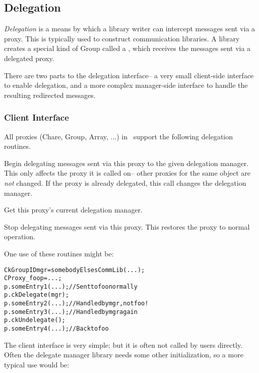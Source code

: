 \subsection{Delegation}
\label{delegation}

{\em Delegation} is a means by which a library writer can 
intercept messages sent via a proxy.  This is typically
used to construct communication libraries.
A library creates a special kind of Group called a 
, which receives the messages
sent via a delegated proxy.

There are two parts to the delegation interface-- a
very small client-side interface to enable delegation,
and a more complex manager-side interface to handle
the resulting redirected messages.

\subsubsection{Client Interface}

All proxies (Chare, Group, Array, ...) in \charmpp\ 
support the following delegation routines.

Begin delegating messages sent via this proxy to the
given delegation manager. This only affects
the proxy it is called on-- other proxies for the
same object are {\em not} changed. If the proxy is 
already delegated, this call changes the delegation manager.

Get this proxy's current delegation manager.

Stop delegating messages sent via this proxy.  
This restores the proxy to normal operation.

One use of these routines might be:

\begin{alltt}
  CkGroupID mgr=somebodyElsesCommLib(...);
  CProxy_foo p=...;
  p.someEntry1(...); //Sent to foo normally
  p.ckDelegate(mgr);
  p.someEntry2(...); //Handled by mgr, not foo!
  p.someEntry3(...); //Handled by mgr again
  p.ckUndelegate();
  p.someEntry4(...); //Back to foo
\end{alltt}

The client interface is very simple; but it is often
not called by users directly.  Often the delegate 
manager library needs some other initialization,
so a more typical use would be:

